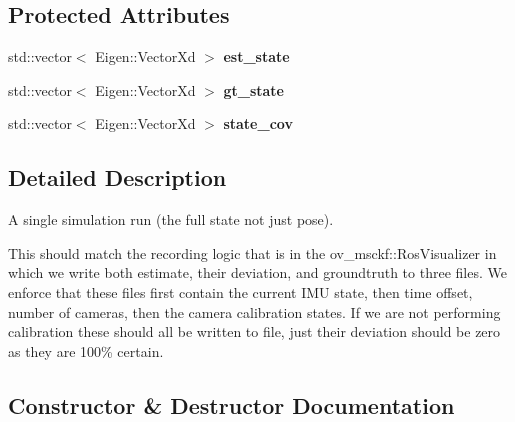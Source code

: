 \subsection*{Protected Attributes}
\begin{DoxyCompactItemize}
\item 
\mbox{\label{classov__eval_1_1ResultSimulation_abba7015a0c17ea62bab2e67599fe928d}} 
std\+::vector$<$ Eigen\+::\+Vector\+Xd $>$ {\bfseries est\+\_\+state}
\item 
\mbox{\label{classov__eval_1_1ResultSimulation_a27c5a2ab21bb80022d2da1ae10886253}} 
std\+::vector$<$ Eigen\+::\+Vector\+Xd $>$ {\bfseries gt\+\_\+state}
\item 
\mbox{\label{classov__eval_1_1ResultSimulation_a41f5acf9da9823cc67c3870334f659d2}} 
std\+::vector$<$ Eigen\+::\+Vector\+Xd $>$ {\bfseries state\+\_\+cov}
\end{DoxyCompactItemize}


\subsection{Detailed Description}
A single simulation run (the full state not just pose). 

This should match the recording logic that is in the ov\+\_\+msckf\+::\+Ros\+Visualizer in which we write both estimate, their deviation, and groundtruth to three files. We enforce that these files first contain the current I\+MU state, then time offset, number of cameras, then the camera calibration states. If we are not performing calibration these should all be written to file, just their deviation should be zero as they are 100\% certain. 

\subsection{Constructor \& Destructor Documentation}
\mbox{\label{classov__eval_1_1ResultSimulation_ad75bc6dc74af33a2ecdf0c8eca44ecca}} 
